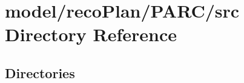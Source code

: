 \section{model/reco\+Plan/\+P\+A\+R\+C/src Directory Reference}
\label{dir_ff60cbb14e3dd5564670eabbede4dd70}
\subsection*{Directories}
\begin{DoxyCompactItemize}
\end{DoxyCompactItemize}
